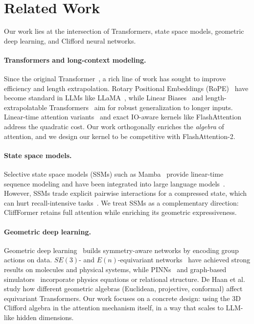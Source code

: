 \documentclass{article}
\theoremstyle{plain}
\theoremstyle{definition}
\theoremstyle{remark}
\begin{document}
\section{Related Work}
\label{sec:related_work}

Our work lies at the intersection of Transformers, state space models, geometric deep learning, and Clifford neural networks.

\paragraph{Transformers and long-context modeling.}
Since the original Transformer~\cite{vaswani2017attention}, a rich line of work has sought to improve efficiency and length extrapolation. Rotary Positional Embeddings (RoPE)~\cite{su2024roformer} have become standard in LLMs like LLaMA~\cite{touvron2023llama,dubey2024llama}, while Linear Biases~\cite{press2022train} and length-extrapolatable Transformers~\cite{sun2022length} aim for robust generalization to longer inputs. Linear-time attention variants~\cite{katharopoulos2020transformers} and exact IO-aware kernels like FlashAttention~\cite{dao2022flashattention,dao2024flashattention2} address the quadratic cost. Our work orthogonally enriches the \emph{algebra} of attention, and we design our kernel to be competitive with FlashAttention-2.

\paragraph{State space models.}
Selective state space models (SSMs) such as Mamba~\cite{gu2024mamba,dao2024transformers} provide linear-time sequence modeling and have been integrated into large language models~\cite{lieber2024jamba}. However, SSMs trade explicit pairwise interactions for a compressed state, which can hurt recall-intensive tasks~\cite{bai2023longbench}. We treat SSMs as a complementary direction: CliffFormer retains full attention while enriching its geometric expressiveness.

\paragraph{Geometric deep learning.}
Geometric deep learning~\cite{bronstein2021geometric} builds symmetry-aware networks by encoding group actions on data. $SE(3)$- and $E(n)$-equivariant networks~\cite{thomas2018tensor,satorras2021n,batzner2022nequip,finzi2020generalizing} have achieved strong results on molecules and physical systems, while PINNs~\cite{raissi2019physics} and graph-based simulators~\cite{sanchez2020learning} incorporate physics equations or relational structure. De Haan et al.~\cite{dehaan2024choosing} study how different geometric algebras (Euclidean, projective, conformal) affect equivariant Transformers. Our work focuses on a concrete design: using the 3D Clifford algebra in the attention mechanism itself, in a way that scales to LLM-like hidden dimensions.
\end{document}
